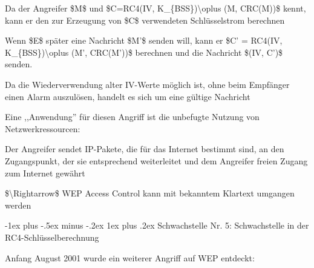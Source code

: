 \documentclass[a4paper]{article}
\makeatletter
\renewcommand{\subsubsection}{\@startsection{subsubsection}{3}{0mm}%
 {-1ex plus -.5ex minus -.2ex}%
 {1ex plus .2ex}%
 {\normalfont\small\bfseries}}
\makeatother
\begin{document}
\begin{multicols}{3}
\begin{itemize*}
            \begin{itemize*}
                  \item Da der Angreifer \$M\$ und \$C=RC4(IV, K\_\{BSS\})\textbackslash oplus (M, CRC(M))\$ kennt, kann er den zur Erzeugung von \$C\$ verwendeten Schlüsselstrom berechnen
                  \item Wenn \$E\$ später eine Nachricht \$M'\$ senden will, kann er \$C' = RC4(IV, K\_\{BSS\})\textbackslash oplus (M', CRC(M'))\$ berechnen und die Nachricht \$(IV, C')\$ senden.
                  \item Da die Wiederverwendung alter IV-Werte möglich ist, ohne beim Empfänger einen Alarm auszulösen, handelt es sich um eine gültige Nachricht
                  \item Eine ,,Anwendung'' für diesen Angriff ist die unbefugte Nutzung von Netzwerkressourcen:
                  \begin{itemize*} \item Der Angreifer sendet IP-Pakete, die für das Internet bestimmt sind, an den Zugangspunkt, der sie entsprechend weiterleitet und dem Angreifer freien Zugang zum Internet gewährt \end{itemize*}
            \end{itemize*}
            \item
            \$\textbackslash Rightarrow\$ WEP Access Control kann mit bekanntem
            Klartext umgangen werden
      \end{itemize*}


      \subsubsection{Schwachstelle Nr. 5: Schwachstelle in der
            RC4-Schlüsselberechnung}

      \begin{itemize*}
            \item
            Anfang August 2001 wurde ein weiterer Angriff auf WEP entdeckt:


\end{itemize*}
\end{multicols}
\end{document}
